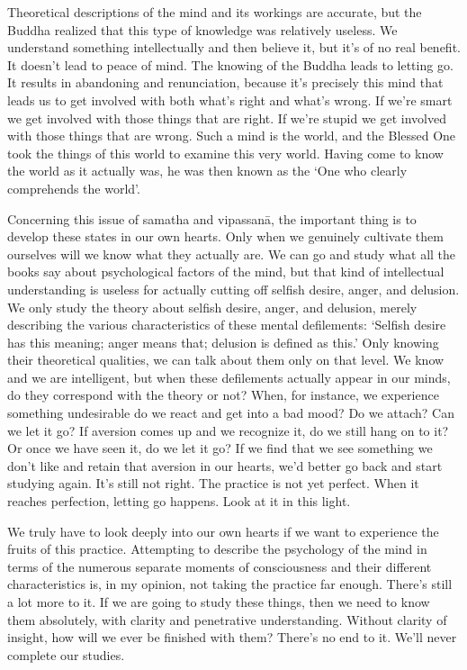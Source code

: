 Theoretical descriptions of the mind and its workings are accurate, but the Buddha realized that this type of knowledge was relatively useless. We understand something intellectually and then believe it, but it's of no real benefit. It doesn't lead to peace of mind. The knowing of the Buddha leads to letting go. It results in abandoning and renunciation, because it's precisely this mind that leads us to get involved with both what's right and what's wrong. If we're smart we get involved with those things that are right. If we're stupid we get involved with those things that are wrong. Such a mind is the world, and the Blessed One took the things of this world to examine this very world. Having come to know the world as it actually was, he was then known as the `One who clearly comprehends the world'.

Concerning this issue of samatha and vipassan\=a, the important thing is to develop these states in our own hearts. Only when we genuinely cultivate them ourselves will we know what they actually are. We can go and study what all the books say about psychological factors of the mind, but that kind of intellectual understanding is useless for actually cutting off selfish desire, anger, and delusion. We only study the theory about selfish desire, anger, and delusion, merely describing the various characteristics of these mental defilements: `Selfish desire has this meaning; anger means that; delusion is defined as this.' Only knowing their theoretical qualities, we can talk about them only on that level. We know and we are intelligent, but when these defilements actually appear in our minds, do they correspond with the theory or not? When, for instance, we experience something undesirable do we react and get into a bad mood? Do we attach? Can we let it go? If aversion comes up and we recognize it, do we still hang on to it? Or once we have seen it, do we let it go? If we find that we see something we don't like and retain that aversion in our hearts, we'd better go back and start studying again. It's still not right. The practice is not yet perfect. When it reaches perfection, letting go happens. Look at it in this light.

We truly have to look deeply into our own hearts if we want to experience the fruits of this practice. Attempting to describe the psychology of the mind in terms of the numerous separate moments of consciousness and their different characteristics is, in my opinion, not taking the practice far enough. There's still a lot more to it. If we are going to study these things, then we need to know them absolutely, with clarity and penetrative understanding. Without clarity of insight, how will we ever be finished with them? There's no end to it. We'll never complete our studies.

